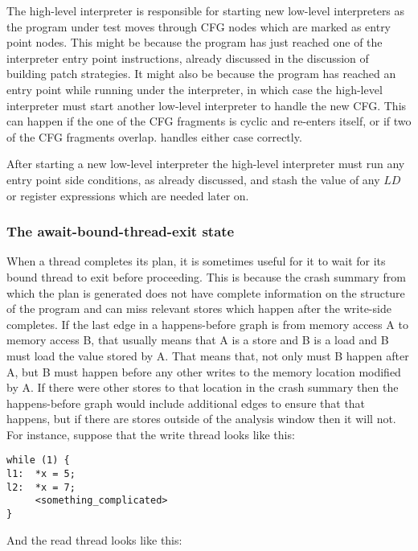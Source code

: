 The high-level interpreter is responsible for starting new low-level
interpreters as the program under test moves through CFG nodes which
are marked as entry point nodes.  This might be because the program
has just reached one of the interpreter entry point instructions,
already discussed in the discussion of building patch strategies.  It
might also be because the program has reached an entry point while
running under the interpreter, in which case the high-level
interpreter must start another low-level interpreter to handle the new
CFG.  This can happen if the one of the CFG fragments is
cyclic and re-enters itself, or if two of the CFG fragments
overlap.  {\Implementation} handles either case correctly.

After starting a new low-level interpreter the high-level interpreter
must run any entry point side conditions, as already discussed, and
stash the value of any $LD$ or register expressions which are needed
later on.

\subsubsection{The await-bound-thread-exit state}

When a thread completes its plan, it is sometimes useful for it to
wait for its bound thread to exit before proceeding.  This is because
the crash summary from which the plan is generated does not have
complete information on the structure of the program and can miss
relevant stores which happen after the write-side {\StateMachine}
completes.  If the last edge in a happens-before graph is from memory
access A to memory access B, that usually means that A is a store and
B is a load and B must load the value stored by A.  That means that,
not only must B happen after A, but B must happen before any other
writes to the memory location modified by A.  If there were other
stores to that location in the crash summary then the happens-before
graph would include additional edges to ensure that that happens, but
if there are stores outside of the analysis window then it will not.
For instance, suppose that the write thread looks like this:

\begin{verbatim}
while (1) {
l1:  *x = 5;
l2:  *x = 7;
     <something_complicated>
}
\end{verbatim}

And the read thread looks like this:

